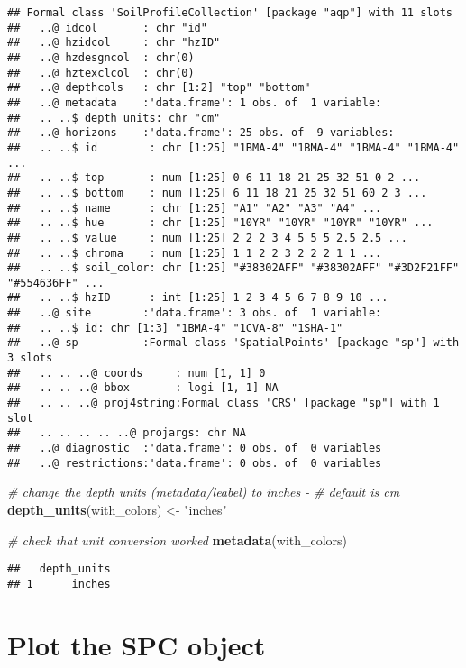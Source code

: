 \documentclass[
]{book}
\newenvironment{Shaded}{\begin{snugshade}}{\end{snugshade}}
\newcommand{\CommentTok}[1]{\textcolor[rgb]{0.56,0.35,0.01}{\textit{#1}}}
\newcommand{\KeywordTok}[1]{\textcolor[rgb]{0.13,0.29,0.53}{\textbf{#1}}}
\newcommand{\NormalTok}[1]{#1}
\newcommand{\StringTok}[1]{\textcolor[rgb]{0.31,0.60,0.02}{#1}}
\begin{document}
\begin{verbatim}
## Formal class 'SoilProfileCollection' [package "aqp"] with 11 slots
##   ..@ idcol       : chr "id"
##   ..@ hzidcol     : chr "hzID"
##   ..@ hzdesgncol  : chr(0) 
##   ..@ hztexclcol  : chr(0) 
##   ..@ depthcols   : chr [1:2] "top" "bottom"
##   ..@ metadata    :'data.frame':	1 obs. of  1 variable:
##   .. ..$ depth_units: chr "cm"
##   ..@ horizons    :'data.frame':	25 obs. of  9 variables:
##   .. ..$ id        : chr [1:25] "1BMA-4" "1BMA-4" "1BMA-4" "1BMA-4" ...
##   .. ..$ top       : num [1:25] 0 6 11 18 21 25 32 51 0 2 ...
##   .. ..$ bottom    : num [1:25] 6 11 18 21 25 32 51 60 2 3 ...
##   .. ..$ name      : chr [1:25] "A1" "A2" "A3" "A4" ...
##   .. ..$ hue       : chr [1:25] "10YR" "10YR" "10YR" "10YR" ...
##   .. ..$ value     : num [1:25] 2 2 2 3 4 5 5 5 2.5 2.5 ...
##   .. ..$ chroma    : num [1:25] 1 1 2 2 3 2 2 2 1 1 ...
##   .. ..$ soil_color: chr [1:25] "#38302AFF" "#38302AFF" "#3D2F21FF" "#554636FF" ...
##   .. ..$ hzID      : int [1:25] 1 2 3 4 5 6 7 8 9 10 ...
##   ..@ site        :'data.frame':	3 obs. of  1 variable:
##   .. ..$ id: chr [1:3] "1BMA-4" "1CVA-8" "1SHA-1"
##   ..@ sp          :Formal class 'SpatialPoints' [package "sp"] with 3 slots
##   .. .. ..@ coords     : num [1, 1] 0
##   .. .. ..@ bbox       : logi [1, 1] NA
##   .. .. ..@ proj4string:Formal class 'CRS' [package "sp"] with 1 slot
##   .. .. .. .. ..@ projargs: chr NA
##   ..@ diagnostic  :'data.frame':	0 obs. of  0 variables
##   ..@ restrictions:'data.frame':	0 obs. of  0 variables
\end{verbatim}

\begin{Shaded}
\begin{Highlighting}[]
\CommentTok{\# change the depth units (metadata/leabel) to inches {-}}
\CommentTok{\# default is cm}
\KeywordTok{depth\_units}\NormalTok{(with\_colors) \textless{}{-}}\StringTok{ "inches"}

\CommentTok{\# check that unit conversion worked}
\KeywordTok{metadata}\NormalTok{(with\_colors)}
\end{Highlighting}
\end{Shaded}

\begin{verbatim}
##   depth_units
## 1      inches
\end{verbatim}

\hypertarget{plot-the-spc-object}{%
\section{Plot the SPC object}\label{plot-the-spc-object}}
\end{document}
